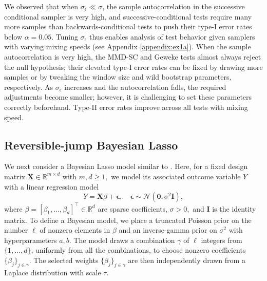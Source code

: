 \documentclass{article}
\begin{document}
We observed that when $\sigma_{\epsilon} \ll \sigma$, the sample autocorrelation in the successive conditional sampler is very high, and successive-conditional tests require many more samples than backwards-conditional tests to push their type-I error rates below $\alpha=0.05$. Tuning $\sigma_{\epsilon}$ thus enables analysis of test behavior given samplers with varying mixing speeds (see Appendix \ref{appendix:ex1a}). When the sample autocorrelation is very high, the MMD-SC and Geweke tests almost always reject the null hypothesis; their elevated type-I error rates can be fixed by drawing more samples or by tweaking the window size and wild bootstrap parameters, respectively. As $\sigma_{\epsilon}$ increases and the autocorrelation falls, the required adjustments become smaller; however, it is challenging to set these parameters correctly beforehand. Type-II error rates improve across all tests with mixing speed.

\subsection{Reversible-jump Bayesian Lasso}
\label{section:ex2}
We next consider a Bayesian Lasso model similar to \cite{chen_bayesian_2011}. 
Here, for a fixed design matrix $\mathbf{X}\in \mathbb{R}^{m\times d}$ with $m, d \geq 1,$ we model its associated outcome variable $Y$ with  
a linear regression model
\begin{equation}
    Y = \mathbf{X}{\beta} + \mathbf{\epsilon}, \quad \mathbf{\epsilon} \sim \mathcal{N}(\mathbf{0}, \sigma^{2} \mathbf{I}), 
    \label{eq:ex2}
\end{equation}
where ${\beta} = [\beta_1, \dots, \beta_d]^{\top} \in \mathbb{R}^d$ are sparse coefficients, $\sigma>0,$ and $\mathbf{I}$ is the identity matrix. 
To define a Bayesian model, we place a truncated Poisson prior on the number $\ell$ of nonzero elements in $\beta$ and an inverse-gamma prior on $\sigma^{2}$ with hyperparameters $a, b$. 
The model draws a combination $\gamma$ of $\ell$ integers from $\{1,\dots, d\}$, uniformly from all the combinations, to choose nonzero coefficients $\{\beta_{j}\}_{j\in \gamma}$.
The selected weights $\{\beta_{j}\}_{j\in \gamma}$ are then independently drawn from a Laplace distribution with scale $\tau$. 
\end{document}
